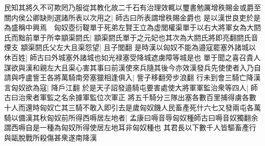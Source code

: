 民知其將久不可欺罔乃服從其教化故二千石有治理效輒以璽書勉厲增秩賜金或爵至關内侯公卿缺則選諸所表以次用之|{
	師古曰所表謂增秩賜金爵也}
是以漢世良吏於是為盛稱中興焉　匈奴壺衍鞮單于死弟左賢王立為虚閭權渠單于以右大將軍女為大閼氏而黜前單于所幸顓渠閼氏|{
	顓渠閼氏單于之元妃也其次為大閼氏將即亮翻閼氏音煙支}
顓渠閼氏父左大且渠怨望|{
	且子閭翻}
是時漢以匈奴不能為邉寇罷塞外諸城以休百姓|{
	師古曰外城塞外諸城也如光禄塞受降城遮虜障等城是也}
單于聞之喜召貴人謀欲與漢和親左大且渠心害其事曰前漢使來兵隨其後今亦效漢發兵先使使者入乃自請與呼盧訾王各將萬騎南旁塞獵相逢俱入|{
	訾子移翻旁步浪翻}
行未到會三騎亡降漢言匈奴欲為寇|{
	降戶江翻}
於是天子詔發邉騎屯要害處使大將軍軍監治衆等四人|{
	師古曰治衆者軍監之名余據軍監位次軍正}
將五千騎分三隊出塞各數百里捕得虜各數十人而還時匈奴亡其三騎不敢入即引去是歲匈奴饑人民畜產死什六七又發兩屯各萬騎以備漢其秋匈奴前所得西嗕居左地者|{
	孟康曰嗕音辱匈奴種師古曰嗕音奴獨翻余謂西嗕自是一種為匈奴所得使居左地耳非匈奴種也}
其君長以下數千人皆驅畜產行與甌脫戰所殺傷甚衆遂南降漢

